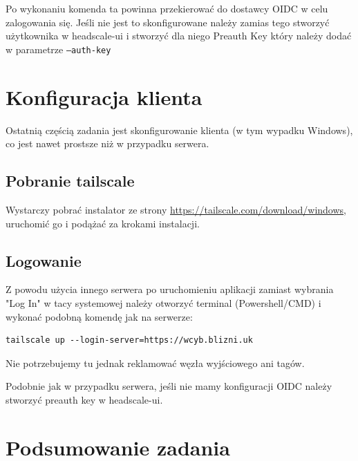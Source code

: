 \documentclass[../main.tex]{subfiles}
\begin{document}
Po wykonaniu komenda ta powinna przekierować do dostawcy OIDC w celu zalogowania się. Jeśli nie jest to skonfigurowane należy zamias tego stworzyć użytkownika w headscale-ui i stworzyć dla niego Preauth Key który należy dodać w parametrze \texttt{--auth-key}

\section{Konfiguracja klienta}
Ostatnią częścią zadania jest skonfigurowanie klienta (w tym wypadku Windows), co jest nawet prostsze niż w przypadku serwera.
\subsection{Pobranie tailscale}
Wystarczy pobrać instalator ze strony \url{https://tailscale.com/download/windows}, uruchomić go i podążać za krokami instalacji.
\subsection{Logowanie}
Z powodu użycia innego serwera po uruchomieniu aplikacji zamiast wybrania "Log In" w tacy systemowej należy otworzyć terminal (Powershell/CMD) i wykonać podobną komendę jak na serwerze:
\begin{verbatim}
tailscale up --login-server=https://wcyb.blizni.uk
\end{verbatim}
Nie potrzebujemy tu jednak reklamować węzła wyjściowego ani tagów.

Podobnie jak w przypadku serwera, jeśli nie mamy konfiguracji OIDC należy stworzyć preauth key w headscale-ui.
\section{Podsumowanie zadania}
\end{document}
